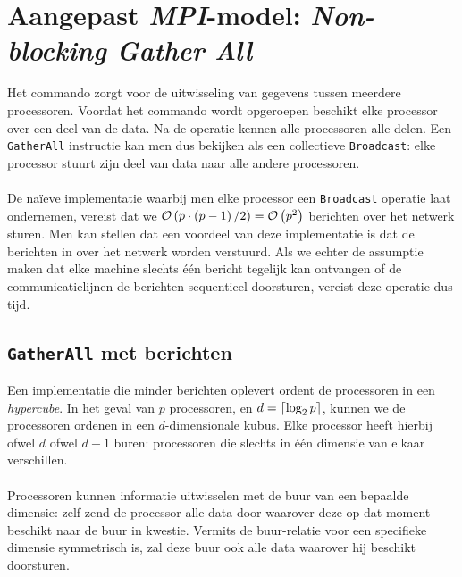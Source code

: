 \section{Aangepast \emph{MPI}-model: \emph{Non-blocking Gather All}}

Het \pgata{\dodt} commando zorgt voor de uitwisseling van gegevens tussen meerdere processoren. Voordat het commando wordt opgeroepen beschikt elke processor over een deel van de data. Na de operatie kennen alle processoren alle delen. Een \texttt{GatherAll} instructie kan men dus bekijken als een collectieve \texttt{Broadcast}: elke processor stuurt zijn deel van data naar alle andere processoren.

\paragraph{}De na\"ieve implementatie waarbij men elke processor een \texttt{Broadcast} operatie laat ondernemen, vereist dat we $\mathcal{O}\left(p\cdot\left(p-1\right)/2\right)=\mathcal{O}\left(p^2\right)$ berichten over het netwerk sturen. Men kan stellen dat een voordeel van deze implementatie is dat de berichten in  over het netwerk worden verstuurd. Als we echter de assumptie maken dat elke machine slechts \'e\'en bericht tegelijk kan ontvangen of de communicatielijnen de berichten sequentieel doorsturen, vereist deze operatie dus  tijd.

\subsection{\texttt{GatherAll} met  berichten}
Een implementatie die minder berichten oplevert ordent de processoren in een \emph{hypercube}\cite[algoritme 4.7]{books/bc/KumarGGK94}. In het geval van $p$ processoren, en $d=\left\lceil \log_2p\right\rceil$, kunnen we de processoren ordenen in een $d$-dimensionale kubus. Elke processor heeft hierbij ofwel $d$ ofwel $d-1$ buren: processoren die slechts in \'e\'en dimensie van elkaar verschillen.

\paragraph{}
Processoren kunnen informatie uitwisselen met de buur van een bepaalde dimensie: zelf zend de processor alle data door waarover deze op dat moment beschikt naar de buur in kwestie. Vermits de buur-relatie voor een specifieke dimensie symmetrisch is, zal deze buur ook alle data waarover hij beschikt doorsturen.

